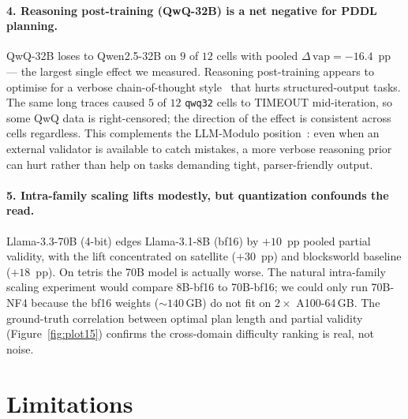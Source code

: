 \paragraph{4. Reasoning post-training (QwQ-32B) is a net negative for PDDL planning.}
QwQ-32B loses to Qwen2.5-32B on $9$ of $12$ cells with pooled
$\Delta\,\text{vap} = -16.4$~pp --- the largest single effect we
measured. Reasoning post-training appears to optimise for a verbose
chain-of-thought style~\cite{kojima2022zeroshot,plaat-reasoning} that
hurts structured-output tasks. The same long traces caused $5$ of $12$
\texttt{qwq32} cells to TIMEOUT mid-iteration, so some QwQ data is
right-censored; the direction of the effect is consistent across cells
regardless. This complements the LLM-Modulo
position~\cite{kambhampati2024llmmodulo}: even when an external
validator is available to catch mistakes, a more verbose reasoning
prior can hurt rather than help on tasks demanding tight,
parser-friendly output.

\paragraph{5. Intra-family scaling lifts modestly, but quantization confounds the read.}
Llama-3.3-70B (4-bit) edges Llama-3.1-8B (bf16) by $+10$~pp pooled
partial validity, with the lift concentrated on satellite ($+30$~pp)
and blocksworld baseline ($+18$~pp). On tetris the 70B model is
actually worse. The natural intra-family scaling experiment would
compare 8B-bf16 to 70B-bf16; we could only run 70B-NF4 because the
bf16 weights ($\sim$$140$\,GB) do not fit on $2 \times$ A100-64\,GB.
The ground-truth correlation between optimal plan length and partial
validity (Figure~\ref{fig:plot15}) confirms the cross-domain
difficulty ranking is real, not noise.

\section{Limitations}
\label{sec:limitations}

